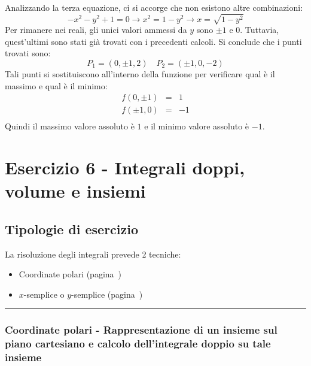 \documentclass[a4paper]{article}
\newcommand{\longline}{\noindent\rule{\textwidth}{0.4pt}}
\begin{document}
	Analizzando la terza equazione, ci si accorge che non esistono altre combinazioni:
	\begin{equation*}
		-x^{2} - y^{2} + 1 = 0 \rightarrow x^{2} = 1 - y^{2} \rightarrow x = \sqrt{1 - y^{2}}
	\end{equation*}
	Per rimanere nei reali, gli unici valori ammessi da $y$ sono $\pm 1$ e $0$. Tuttavia, quest'ultimi sono stati già trovati con i precedenti calcoli. Si conclude che i punti trovati sono:
	\begin{equation*}
		P_{1} = \left(0, \pm 1, 2\right) \hspace{1em} P_{2} = \left(\pm 1, 0, -2\right)
	\end{equation*}
	Tali punti si sostituiscono all'interno della funzione per verificare qual è il massimo e qual è il minimo:
	\begin{equation*}
		\begin{array}{lcl}
			f\left(0, \pm 1\right) &=& 1 \\
			f\left(\pm 1, 0\right) &=& -1 \\
		\end{array}
	\end{equation*}
	Quindi il massimo valore assoluto è $1$ e il minimo valore assoluto è $-1$.

	\newpage

	\section{Esercizio 6 - Integrali doppi, volume e insiemi}

	\subsection{Tipologie di esercizio}

	La risoluzione degli integrali prevede 2 tecniche:
	\begin{itemize}
		\item Coordinate polari (pagina~\pageref{par: coordinate polari})
		\item $x$-semplice o $y$-semplice (pagina~\pageref{par: x-semplice e y-semplice - calcolo integrale doppio})
	\end{itemize}

	\longline

	\subsubsection{Coordinate polari - Rappresentazione di un insieme sul piano cartesiano e calcolo dell'integrale doppio su tale insieme}\label{par: coordinate polari}
\end{document}
